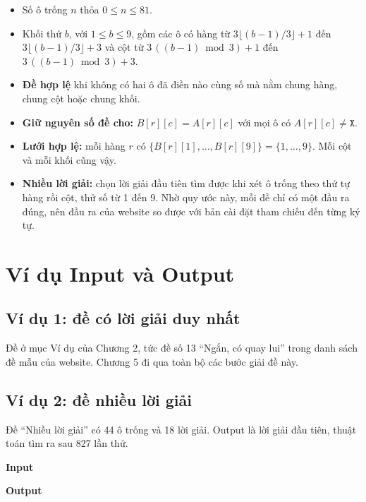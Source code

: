 \begin{itemize}
  \item Số ô trống \(n\) thỏa \(0 \le n \le 81\).
  \item Khối thứ \(b\), với \(1 \le b \le 9\), gồm các ô có hàng từ \(3\lfloor (b-1)/3 \rfloor + 1\) đến \(3\lfloor (b-1)/3 \rfloor + 3\) và cột từ \(3\,((b-1) \bmod 3) + 1\) đến \(3\,((b-1) \bmod 3) + 3\).
  \item \textbf{Đề hợp lệ} khi không có hai ô đã điền nào cùng số mà nằm chung hàng, chung cột hoặc chung khối.
  \item \textbf{Giữ nguyên số đề cho:} \(B[r][c] = A[r][c]\) với mọi ô có \(A[r][c] \ne \texttt{X}\).
  \item \textbf{Lưới hợp lệ:} mỗi hàng \(r\) có \(\{B[r][1], \ldots, B[r][9]\} = \{1, \ldots, 9\}\). Mỗi cột và mỗi khối cũng vậy.
  \item \textbf{Nhiều lời giải:} chọn lời giải đầu tiên tìm được khi xét ô trống theo thứ tự hàng rồi cột, thử số từ 1 đến 9. Nhờ quy ước này, mỗi đề chỉ có một đầu ra đúng, nên đầu ra của website so được với bản cài đặt tham chiếu đến từng ký tự.
\end{itemize}

\section{Ví dụ Input và Output}

\subsection*{Ví dụ 1: đề có lời giải duy nhất}

Đề ở mục Ví dụ của Chương 2, tức đề số 13 ``Ngắn, có quay lui'' trong danh sách đề mẫu của website. Chương 5 đi qua toàn bộ các bước giải đề này.

\subsection*{Ví dụ 2: đề nhiều lời giải}

Đề ``Nhiều lời giải'' có 44 ô trống và 18 lời giải. Output là lời giải đầu tiên, thuật toán tìm ra sau 827 lần thử.

\begin{center}
  \begin{minipage}[t]{0.44\linewidth}
    \textbf{Input}
    
  \end{minipage}
  \hfill
  \begin{minipage}[t]{0.44\linewidth}
    \textbf{Output}
    
  \end{minipage}
\end{center}

